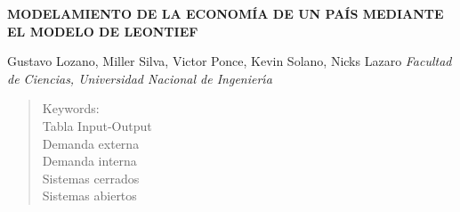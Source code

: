 \documentclass[10pt,a4paper]{article}
\begin{document}
\begin{center}
 {\Large \textbf{MODELAMIENTO DE LA ECONOMÍA DE UN PAÍS MEDIANTE EL MODELO DE LEONTIEF }}
\end{center}
\begin{center}
 Gustavo Lozano, Miller Silva, Victor Ponce, Kevin Solano, Nicks Lazaro\vskip5pt
{\it Facultad de Ciencias, Universidad Nacional de Ingenier\'{\i}a\\}
\end{center}
\vspace*{1cm}
\begin{abstract}
\noindent El modelo de Leontief tambien conocido por el modelo de IO(Input-Output) se elabora a partir de datos económicos observados en una región, que puede ir desde una nación a una región dentro de la misma. Concierne por regla general a la producción industrial agrupada en sectores. La actividad económica en la región se divide en un número de segmentos o de sectores productivos. Pueden ser industrias en sentido más general (automóviles) o más específico como (industria de neumáticos). Cada sector agrupa actividades que tienen diferentes ritmos de consumo y producción de bienes. Parte de la producción de un sector (Output) puede ir al consumo (Input) de otro distinto sector dentro de la región bajo estudio. Esta información se recolecta en forma de una tabla denominada: Tabla Input-Output o Tabla IO. Las tablas con sus interdependencias se suelen elaborar con datos procedentes de intervalos anuales. Los intercambios de bienes suelen ser indicados como ventas, compras o bienes físicos. Pero es habitual que las unidades de medida empleados en el modelo se realice en términos monetarios. 

\end{abstract}

\begin{quotation}
	{\small
		
		Keywords: \\ 
		Tabla Input-Output\\
		Demanda externa\\
		Demanda interna\\
		Sistemas cerrados\\
		Sistemas abiertos\\
	}
\end{quotation}
\end{document}
